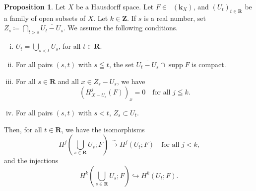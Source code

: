﻿\documentclass[a4paper,leqno]{jsarticle}
\theoremstyle{definition}
\newtheorem{Proposition+}[Axiom+]{Proposition}
\newcommand{\zz}{\mathbf{Z}}
\newcommand{\rr}{\mathbf{R}}
\newcommand{\kk}{\mathbf{k}}
\numberwithin{equation}{section}
\newcommand{\supp}{\mathop{\mathrm{supp}}\nolimits}
\newcommand{\Dompl}{\mathop{\mathsf{D}^\mathrm{+}}\nolimits}
\newcommand{\simar}{\mathrel{\overset{\sim}{\rightarrow}}}%
\theoremstyle{mystyle}
\newcommand{\smi}{-}
\begin{document}
\begin{Proposition+}\label{prp:t-nonchar}
  Let \(X\) be a Hausdorff space. 
  Let \(F\in\Dompl(\kk_X)\), and 
  \(\left(U_{t}\right)_{t\in\rr}\) be a family of 
  open subsets of \(X\). 
  Let \(k\in\zz\). 
  If \(s\) is a real number, set \(
    Z_{s}\coloneqq \bigcap_{t>s}\overline{U_t\smi U_s}
  \). 
  We assume the following conditions. 
  \begin{enumerate}[(i)]
    \item \label{item:t-nonchar1}
    \(U_{t}=\bigcup_{s<t}U_{s}\), for all \(t\in\rr\). 
    \item \label{item:t-nonchar2}
    For all pairs \((s,t)\) with \(s\leqq t\), 
    the set \(\overline{U_{t}\smi U_{s}}\cap \supp{F}\) is compact.
    \item \label{item:t-nonchar3}
    For all \(s\in\rr\) and all \(x\in Z_{s}\smi U_{s}\), 
    we have\[
      (H^{j}_{X\smi U_{s}}(F))_{x}=0
      \quad 
      \text{for all \(j\leqq k\).}
    \]
    \item \label{item:t-nonchar4} 
    For all pairs \((s,t)\) with \(s< t\), \(Z_s\subset U_{t}\).
  \end{enumerate}
  Then, for all \(t\in\rr\), we have the isomorphisms\[
    H^{j}\left(\bigcup_{s\in\rr}U_{s};F\right)
    \simar 
    H^{j}\left(U_{t};F\right)
    \quad \text{for all \(j< k\),} 
  \]
  and the injections\[
    H^{k}\left(\bigcup_{s\in\rr}U_{s};F\right)
    \hookrightarrow 
    H^{k}\left(U_{t};F\right).
  \] 
\end{Proposition+}
\end{document}
